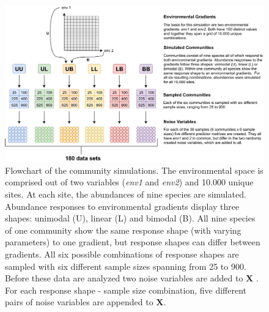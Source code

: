 \documentclass[a4paper,11pt]{article}
\begin{document}
		\begin{figure}[ht]
			\centering
			\includegraphics[width=1\linewidth]{190917_MTP_MM_FLOWCHART}
			\caption{
			        Flowchart of the community simulations. 
			        The environmental space is comprised out of two variables (\textit{env1} and \textit{env2}) and 10.000 unique sites.
			        At each site, the abundances of nine species are simulated. 
			        Abundance responses to environmental gradients display three shapes:
			        unimodal (U), linear (L) and bimodal (B). 
			         All nine species of one community show the same response shape (with varying parameters) to one gradient, but response shapes can differ between gradients. 
			         All six possible combinations of response shapes are sampled with six different sample sizes spanning from 25 to 900.
                    Before these data are analyzed two noise variables are added to $\mathbf{X}$ .
                    For each response shape - sample size combination, five different pairs of noise variables are appended to $\mathbf{X}$. 
			        }
			\label{fig:flowchart_simulation}
		\end{figure}
	
	    
\end{document}
